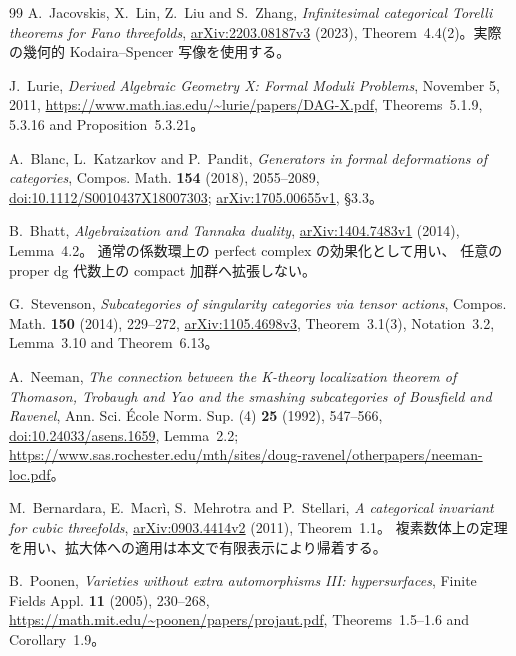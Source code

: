 \documentclass[11pt,a4paper]{ltjsarticle}
\numberwithin{equation}{section}
\begin{document}
\begin{thebibliography}{99}
A.~Jacovskis, X.~Lin, Z.~Liu and S.~Zhang,
\emph{Infinitesimal categorical Torelli theorems for Fano threefolds},
\href{https://arxiv.org/abs/2203.08187v3}{arXiv:2203.08187v3} (2023),
Theorem~4.4(2)。実際の幾何的 Kodaira--Spencer 写像を使用する。

J.~Lurie, \emph{Derived Algebraic Geometry X: Formal Moduli Problems},
November 5, 2011,
\url{https://www.math.ias.edu/~lurie/papers/DAG-X.pdf},
Theorems~5.1.9, 5.3.16 and Proposition~5.3.21。

A.~Blanc, L.~Katzarkov and P.~Pandit,
\emph{Generators in formal deformations of categories},
Compos. Math. \textbf{154} (2018), 2055--2089,
\href{https://doi.org/10.1112/S0010437X18007303}{doi:10.1112/S0010437X18007303};
\href{https://arxiv.org/abs/1705.00655v1}{arXiv:1705.00655v1}, \S3.3。

B.~Bhatt, \emph{Algebraization and Tannaka duality},
\href{https://arxiv.org/abs/1404.7483v1}{arXiv:1404.7483v1} (2014),
Lemma~4.2。
通常の係数環上の perfect complex の効果化として用い、
任意の proper dg 代数上の compact 加群へ拡張しない。

G.~Stevenson, \emph{Subcategories of singularity categories via tensor actions},
Compos. Math. \textbf{150} (2014), 229--272,
\href{https://arxiv.org/abs/1105.4698v3}{arXiv:1105.4698v3},
Theorem~3.1(3), Notation~3.2, Lemma~3.10 and Theorem~6.13。

A.~Neeman, \emph{The connection between the K-theory localization theorem of Thomason,
Trobaugh and Yao and the smashing subcategories of Bousfield and Ravenel},
Ann. Sci. \'Ecole Norm. Sup. (4) \textbf{25} (1992), 547--566,
\href{https://doi.org/10.24033/asens.1659}{doi:10.24033/asens.1659}, Lemma~2.2;
\url{https://www.sas.rochester.edu/mth/sites/doug-ravenel/otherpapers/neeman-loc.pdf}。

M.~Bernardara, E.~Macr\`i, S.~Mehrotra and P.~Stellari,
\emph{A categorical invariant for cubic threefolds},
\href{https://arxiv.org/abs/0903.4414v2}{arXiv:0903.4414v2} (2011), Theorem~1.1。
複素数体上の定理を用い、拡大体への適用は本文で有限表示により帰着する。

B.~Poonen, \emph{Varieties without extra automorphisms III: hypersurfaces},
Finite Fields Appl. \textbf{11} (2005), 230--268,
\url{https://math.mit.edu/~poonen/papers/projaut.pdf},
Theorems~1.5--1.6 and Corollary~1.9。


\end{thebibliography}
\end{document}
